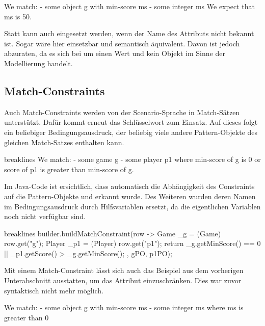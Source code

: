 \begin{mdcodeblock}
    We match:
    - some object g with min-score ms
    - some integer ms
    We expect that ms is 50.
\end{mdcodeblock}

Statt  kann auch  eingesetzt werden, wenn der Name des Attributs nicht bekannt ist.
Sogar  wäre hier einsetzbar und semantisch äquivalent.
Davon ist jedoch abzuraten, da es sich bei  um einen Wert und kein Objekt im Sinne der Modellierung handelt.

\subsection{Match-Constraints}

Auch Match-Constraints werden von der Scenario-Sprache in Match-Sätzen unterstützt.
Dafür kommt erneut das Schlüsselwort  zum Einsatz.
Auf dieses folgt ein beliebiger Bedingungsausdruck, der beliebig viele andere Pattern-Objekte des gleichen Match-Satzes enthalten kann.

\begin{mdcodeblock*}{breaklines}
    We match:
    - some game g
    - some player p1
    where min-score of g is 0 or score of p1 is greater than min-score of g.
\end{mdcodeblock*}

Im Java-Code ist ersichtlich, dass automatisch die Abhängigkeit des Constraints auf die Pattern-Objekte  und  erkannt wurde.
Des Weiteren wurden deren Namen im Bedingungsausdruck durch Hilfsvariablen ersetzt, da die eigentlichen Variablen noch nicht verfügbar sind.

\begin{jcodeblock*}{breaklines}
    builder.buildMatchConstraint(row -> {
        Game _g = (Game) row.get("g");
        Player _p1 = (Player) row.get("p1");
        return _g.getMinScore() == 0 || _p1.getScore() > _g.getMinScore();
    }, gPO, p1PO);
\end{jcodeblock*}

Mit einem Match-Constraint lässt sich auch das Beispiel aus dem vorherigen Unterabschnitt ausstatten, um das Attribut  einzuschränken.
Dies war zuvor syntaktisch nicht mehr möglich.

\begin{mdcodeblock}
    We match:
    - some object g with min-score ms
    - some integer ms where ms is greater than 0
\end{mdcodeblock}
